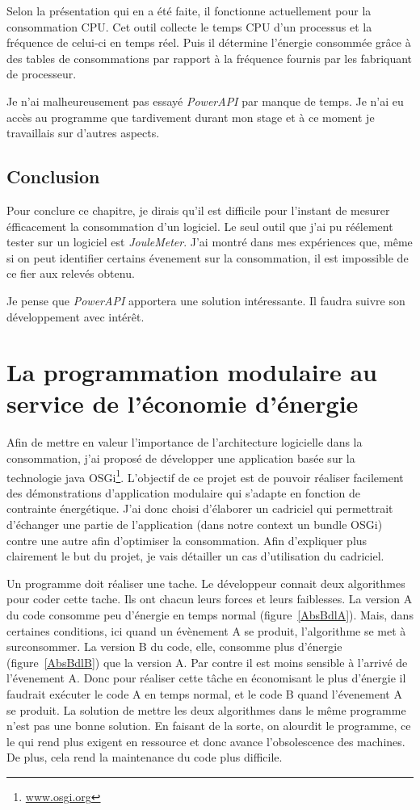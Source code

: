 \documentclass[a4paper, 11pt]{report}
\begin{document}
Selon la présentation qui en a été faite, il fonctionne actuellement pour la consommation CPU. Cet outil collecte le temps CPU d'un processus et la fréquence de celui-ci en temps réel. Puis il détermine l'énergie consommée grâce à des tables de consommations par rapport à la fréquence fournis par les fabriquant de processeur.

Je n'ai malheureusement pas essayé \textit{PowerAPI} par manque de temps. Je n'ai eu accès au programme que tardivement durant mon stage et à ce moment je travaillais sur d'autres aspects.
	
	\section{Conclusion}
Pour conclure ce chapitre, je dirais qu'il est difficile pour l'instant de mesurer éfficacement la consommation d'un logiciel. Le seul outil que j'ai pu réélement tester sur un logiciel est \textit{JouleMeter}. J'ai montré dans mes expériences que, même si on peut identifier certains évenement sur la consommation, il est impossible de ce fier aux relevés obtenu.

Je pense que \textit{PowerAPI} apportera une solution intéressante. Il faudra suivre son développement avec intérêt.


\chapter{La programmation modulaire au service de l'économie d'énergie}
Afin de mettre en valeur l'importance de l'architecture logicielle dans la consommation, j'ai proposé de développer une application basée sur la technologie java OSGi\footnote{\href{http://www.osgi.org}{www.osgi.org}}. L'objectif de ce projet est de pouvoir réaliser facilement des démonstrations d'application modulaire qui s'adapte en fonction de contrainte énergétique. J'ai donc choisi d'élaborer un cadriciel qui permettrait d'échanger une partie de l'application (dans notre context un \og bundle \fg OSGi) contre une autre afin d'optimiser la consommation. Afin d'expliquer plus clairement le but du projet, je vais détailler un cas d'utilisation du cadriciel.

Un programme doit réaliser une tache. Le développeur connait deux algorithmes pour coder cette tache. Ils ont chacun leurs forces et leurs faiblesses. La version A du code consomme peu d'énergie en temps normal (figure~\ref{AbsBdlA}). Mais, dans certaines conditions, ici quand un évènement A se produit, l'algorithme se met à surconsommer. La version B du code, elle, consomme plus d'énergie (figure~\ref{AbsBdlB}) que la version A. Par contre il est moins sensible à l'arrivé de l'évenement A. Donc pour réaliser cette tâche en économisant le plus d'énergie il faudrait exécuter le code A en temps normal, et le code B quand l'évenement A se produit. La solution de mettre les deux algorithmes dans le même programme n'est pas une bonne solution. En faisant de la sorte, on alourdit le programme, ce le qui rend plus exigent en ressource et donc avance l'obsolescence des machines. De plus, cela rend la maintenance du code plus difficile.
\end{document}
